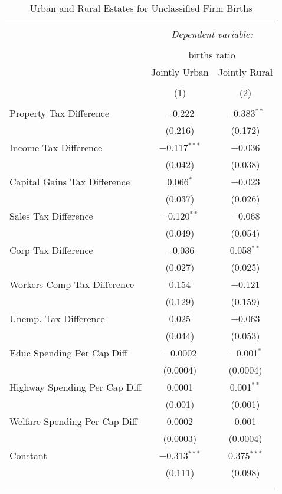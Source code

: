 
\begin{table}[!htbp] \centering 
  \caption{Urban and Rural Estates for  Unclassified Firm Births} 
  \label{} 
\begin{tabular}{@{\extracolsep{5pt}}lcc} 
\\[-1.8ex]\hline 
\hline \\[-1.8ex] 
 & \multicolumn{2}{c}{\textit{Dependent variable:}} \\ 
\cline{2-3} 
\\[-1.8ex] & \multicolumn{2}{c}{births ratio} \\ 
 & Jointly Urban & Jointly Rural \\ 
\\[-1.8ex] & (1) & (2)\\ 
\hline \\[-1.8ex] 
 Property Tax Difference & $-$0.222 & $-$0.383$^{**}$ \\ 
  & (0.216) & (0.172) \\ 
  Income Tax Difference & $-$0.117$^{***}$ & $-$0.036 \\ 
  & (0.042) & (0.038) \\ 
  Capital Gains Tax Difference & 0.066$^{*}$ & $-$0.023 \\ 
  & (0.037) & (0.026) \\ 
  Sales Tax Difference & $-$0.120$^{**}$ & $-$0.068 \\ 
  & (0.049) & (0.054) \\ 
  Corp Tax Difference & $-$0.036 & 0.058$^{**}$ \\ 
  & (0.027) & (0.025) \\ 
  Workers Comp Tax Difference & 0.154 & $-$0.121 \\ 
  & (0.129) & (0.159) \\ 
  Unemp. Tax Difference & 0.025 & $-$0.063 \\ 
  & (0.044) & (0.053) \\ 
  Educ Spending Per Cap Diff & $-$0.0002 & $-$0.001$^{*}$ \\ 
  & (0.0004) & (0.0004) \\ 
  Highway Spending Per Cap Diff & 0.0001 & 0.001$^{**}$ \\ 
  & (0.001) & (0.001) \\ 
  Welfare Spending Per Cap Diff & 0.0002 & 0.001 \\ 
  & (0.0003) & (0.0004) \\ 
  Constant & $-$0.313$^{***}$ & 0.375$^{***}$ \\ 
  & (0.111) & (0.098) \\ 
 \hline \\[-1.8ex] 
\hline 
\hline \\[-1.8ex] 
\end{tabular} 
\end{table} 
